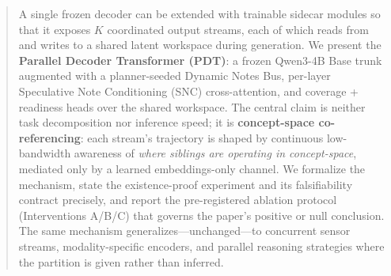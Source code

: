 \begin{abstract}
A single frozen decoder can be extended with trainable sidecar modules so that it exposes $K$ coordinated output streams, each of which reads from and writes to a shared latent workspace during generation. We present the \textbf{Parallel Decoder Transformer (PDT)}: a frozen Qwen3-4B Base trunk augmented with a planner-seeded Dynamic Notes Bus, per-layer Speculative Note Conditioning (SNC) cross-attention, and coverage + readiness heads over the shared workspace. The central claim is neither task decomposition nor inference speed; it is \textbf{concept-space co-referencing}: each stream's trajectory is shaped by continuous low-bandwidth awareness of \emph{where siblings are operating in concept-space}, mediated only by a learned embeddings-only channel. We formalize the mechanism, state the existence-proof experiment and its falsifiability contract precisely, and report the pre-registered ablation protocol (Interventions A/B/C) that governs the paper's positive or null conclusion. The same mechanism generalizes---unchanged---to concurrent sensor streams, modality-specific encoders, and parallel reasoning strategies where the partition is given rather than inferred.
\end{abstract}
